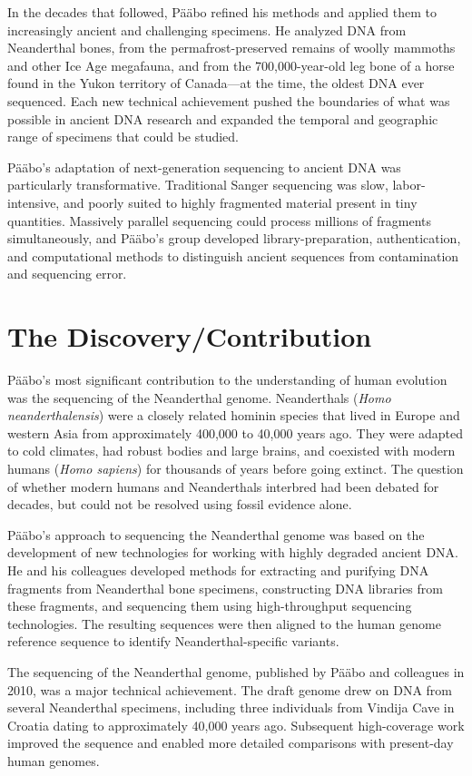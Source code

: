 In the decades that followed, P\"a\"abo refined his methods and applied them to increasingly ancient and challenging specimens. He analyzed DNA from Neanderthal bones, from the permafrost-preserved remains of woolly mammoths and other Ice Age megafauna, and from the 700,000-year-old leg bone of a horse found in the Yukon territory of Canada---at the time, the oldest DNA ever sequenced. Each new technical achievement pushed the boundaries of what was possible in ancient DNA research and expanded the temporal and geographic range of specimens that could be studied.

P\"a\"abo's adaptation of next-generation sequencing to ancient DNA was particularly transformative. Traditional Sanger sequencing was slow, labor-intensive, and poorly suited to highly fragmented material present in tiny quantities. Massively parallel sequencing could process millions of fragments simultaneously, and P\"a\"abo's group developed library-preparation, authentication, and computational methods to distinguish ancient sequences from contamination and sequencing error.

\section{The Discovery/Contribution}

P\"a\"abo's most significant contribution to the understanding of human evolution was the sequencing of the Neanderthal genome. Neanderthals (\textit{Homo neanderthalensis}) were a closely related hominin species that lived in Europe and western Asia from approximately 400,000 to 40,000 years ago. They were adapted to cold climates, had robust bodies and large brains, and coexisted with modern humans (\textit{Homo sapiens}) for thousands of years before going extinct. The question of whether modern humans and Neanderthals interbred had been debated for decades, but could not be resolved using fossil evidence alone.

P\"a\"abo's approach to sequencing the Neanderthal genome was based on the development of new technologies for working with highly degraded ancient DNA. He and his colleagues developed methods for extracting and purifying DNA fragments from Neanderthal bone specimens, constructing DNA libraries from these fragments, and sequencing them using high-throughput sequencing technologies. The resulting sequences were then aligned to the human genome reference sequence to identify Neanderthal-specific variants.

The sequencing of the Neanderthal genome, published by P\"a\"abo and colleagues in 2010, was a major technical achievement. The draft genome drew on DNA from several Neanderthal specimens, including three individuals from Vindija Cave in Croatia dating to approximately 40,000 years ago. Subsequent high-coverage work improved the sequence and enabled more detailed comparisons with present-day human genomes.

